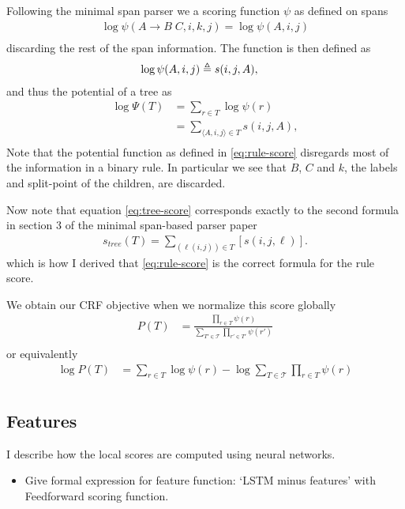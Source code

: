 Following the minimal span parser we a scoring function $\psi$ as defined on spans
\begin{align}
  \log\psi(A \to B \;C, i, k, j) = \log\psi(A, i, j)\\
\end{align}
discarding the rest of the span information. The function is then defined as
\begin{align}
  \label{eq:span-score}
  \log\psi(A, i, j) &\triangleq s(i, j, A),
\end{align}
and thus the potential of a tree as
\begin{align}
\label{eq:tree-score}
    \log\Psi(T) &= \sum_{r \in T} \log\psi(r) \\
      &= \sum_{\langle A, i, j \rangle \in T} s(i, j, A), \\
\end{align}
Note that the potential function as defined in \ref{eq:rule-score} disregards most of the information in a binary rule. In particular we see that $B$, $C$ and $k$, the labels and split-point of the children, are discarded.

Now note that equation \ref{eq:tree-score} corresponds exactly to the second formula in section 3 of the minimal span-based parser paper
\begin{align}
s_{tree}(T) = \sum_{(\ell(i,j))\in T}[s(i, j, \ell)] .
\end{align}
which is how I derived that \ref{eq:rule-score} is the correct formula for the rule score.

We obtain our CRF objective when we normalize this score globally
\begin{align}
\label{eq:crf-objective}
    P(T) &= \frac{\prod_{r \in T} \psi(r)}{\sum_{T' \in \mathcal{T}} \prod_{r' \in T'} \psi(r')} \\
\end{align}
or equivalently
\begin{align}
\label{eq:logcrf-objective}
    \log P(T) &= \sum_{r \in T} \log \psi(r) - \log \sum_{T \in \mathcal{T}} \prod_{r \in T} \psi(r) \\
\end{align}


\subsection{Features}
I describe how the local scores are computed using neural networks.
\begin{itemize}
  \item Give formal expression for feature function: `LSTM minus features' with Feedforward scoring function.
\end{itemize}

